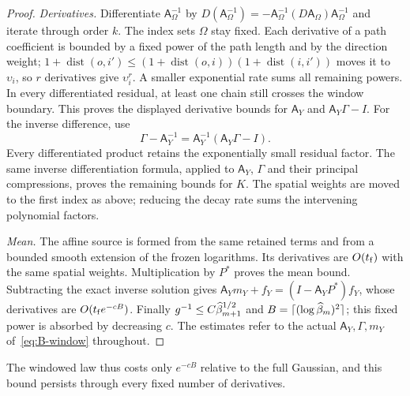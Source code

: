 \begin{proof}
\emph{Derivatives.} Differentiate $\mathsf A_\Omega^{-1}$ by $D(\mathsf A_\Omega^{-1})=-\mathsf A_\Omega^{-1}(D\mathsf A_\Omega)\mathsf A_\Omega^{-1}$ and iterate through order $k$. The index sets $\Omega$ stay fixed. Each derivative of a path coefficient is bounded by a fixed power of the path length and by the direction weight; $1+\operatorname{dist}(o,i')\le(1+\operatorname{dist}(o,i))(1+\operatorname{dist}(i,i'))$ moves it to~$\upsilon_i$, so $r$ derivatives give $\upsilon_i^r$. A smaller exponential rate sums all remaining powers. In every differentiated residual, at least one chain still crosses the window boundary. This proves the displayed derivative bounds for $\mathsf A_Y$ and $\mathsf A_Y\Gamma-I$. For the inverse difference, use
\begin{equation*}
\Gamma-\mathsf A_Y^{-1}=\mathsf A_Y^{-1}(\mathsf A_Y\Gamma-I).
\end{equation*}
Every differentiated product retains the exponentially small residual factor. The same inverse differentiation formula, applied to $\mathsf A_Y$, $\Gamma$ and their principal compressions, proves the remaining bounds for $K$. The spatial weights are moved to the first index as above; reducing the decay rate sums the intervening polynomial factors.

\emph{Mean.} The affine source is formed from the same retained terms and from a bounded smooth extension of the frozen logarithms. Its derivatives are $O(t_{\rm f})$ with the same spatial weights. Multiplication by $P^*$ proves the mean bound. Subtracting the exact inverse solution gives $\mathsf A_Ym_Y+f_Y=(I-\mathsf A_YP^*)f_Y$, whose derivatives are $O(t_{\rm f}e^{-cB})$. Finally $g^{-1}\le C\widehat{\beta}_{m+1}^{1/2}$ and $B=\lceil(\log\widehat{\beta}_m)^2\rceil$; this fixed power is absorbed by decreasing $c$. The estimates refer to the actual $\mathsf A_Y,\Gamma,m_Y$ of~\eqref{eq:B-window} throughout.
\end{proof}
The windowed law thus costs only $e^{-cB}$ relative to the full Gaussian, and this bound persists through every fixed number of derivatives.

